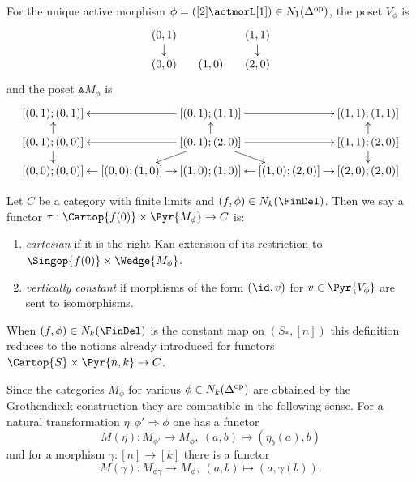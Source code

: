 \documentclass[a4paper]{article}
\numberwithin{equation}{section}
\begin{document}
 \begin{exam}
  \label{Vphiact}
  For the unique active morphism $\phi = ([2] \actmorL [1]) \in N_1(\Delta^{\rm op})$, the poset $V_\phi$ is
\begin{equation*}
 \xymatrixrowsep{.8pc}\xymatrixcolsep{1.1pc} \xymatrix{(0,1) \ar[d]  & & (1,1) \ar[d] \\
 (0,0)  & (1,0)  & (2,0)}
\end{equation*}
and the poset $\Wedge {M_\phi}$ is
\begin{equation*}
 \xymatrixcolsep{.75pc}\xymatrixrowsep{.8pc} \xymatrix{[(0,1);(0,1)] & & \ar[ll] [(0,1);(1,1)] \ar[rr] & & [(1,1);(1,1)] \\
 [(0,1);(0,0)] \ar[u] \ar[d] & & [(0,1);(2,0)] \ar[ll] \ar[u] \ar[rr] \ar[rd] \ar[ld] & & [(1,1);(2,0)] \ar[u] \ar[d] \\
 [(0,0);(0,0)] & \ar[l] [(0,0);(1,0)] \ar[r] & [(1,0);(1,0)] & \ar[l] [(1,0);(2,0)] \ar[r] & [(2,0);(2,0)] }
\end{equation*}
\end{exam}


\begin{defn}
 Let $C$ be a category with finite limits and $(f,\phi)\in N_k(\FinDel)$. Then we say a functor $\tau: \Cartop{f(0)}\times \Pyr {M_\phi} \to C$ is:
 \begin{enumerate}
  \item {\em cartesian} if it is the right Kan extension of its restriction to $\Singop{f(0)} \times \Wedge{M_\phi}$.
  \item {\em vertically constant} if morphisms of the form $(\id, v)$ for $v \in \Pyr{V_\phi}$ are sent to isomorphisms.
 \end{enumerate}
\end{defn}
\begin{remark}
 When $(f,\phi) \in N_k(\FinDel)$ is the constant map on $(S_*, [n])$ this definition reduces to the notions already introduced for functors $\Cartop{S}\times\Pyr{n,k} \to C$.
\end{remark}

Since the categories $M_\phi$ for various $\phi \in N_k(\Delta^{\rm op})$ are obtained by the Grothendieck construction they are compatible in the following sense. For a natural transformation $\eta: \phi' \Rightarrow \phi$ one has a functor 
\begin{equation*}
M(\eta): M_{\phi'} \to M_{\phi}, \ (a,b) \mapsto (\eta_b(a), b)
\end{equation*}
and for a morphism $\gamma: [n] \to [k]$ there is a functor 
\begin{equation*}
M(\gamma): M_{\phi \gamma} \to M_{\phi}, \ (a,b) \mapsto (a, \gamma(b)).
\end{equation*}
\end{document}
